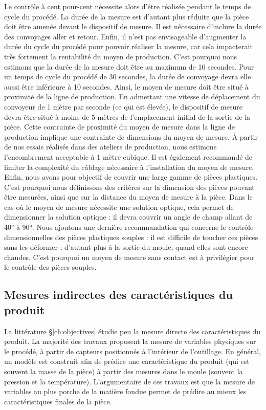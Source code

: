 Le contrôle à cent pour-cent nécessite alors d'être réalisée pendant le temps de cycle du procédé.
La durée de la mesure est d'autant plus réduite que la pièce doit être amenée devant le dispositif de mesure.
Il est nécessaire d'inclure la durée des convoyages aller et retour.
Enfin, il n'est pas envisageable d'augmenter la durée du cycle du procédé pour pouvoir réaliser la mesure, car cela impacterait très fortement la rentabilité du moyen de production.
C'est pourquoi nous estimons que la durée de la mesure doit être au maximum de 10 secondes.
Pour un temps de cycle du procédé de 30 secondes, la durée de convoyage devra elle aussi être inférieure à 10 secondes.
%
Ainsi, le moyen de mesure doit être situé à proximité de la ligne de production.
En admettant une vitesse de déplacement du convoyeur de 1 mètre par seconde (ce qui est élevée), le dispositif de mesure devra être situé à moins de 5 mètres de l'emplacement initial de la sortie de la pièce.
%
Cette contrainte de proximité du moyen de mesure dans la ligne de production implique une contrainte de dimensions du moyen de mesure.
À partir de nos essais réalisés dans des ateliers de production, nous estimons l'encombrement acceptable à 1 mètre cubique.
Il est également recommandé de limiter la complexité du câblage nécessaire à l'installation du moyen de mesure.
%
Enfin, nous avons pour objectif de couvrir une large gamme de pièces plastiques.
C'est pourquoi nous définissons des critères sur la dimension des pièces pouvant être mesurées, ainsi que sur la distance du moyen de mesure à la pièce.
Dans le cas où le moyen de mesure nécessite une solution optique, cela permet de dimensionner la solution optique : il devra couvrir un angle de champ allant de 40° à 90°.
%
Nous ajoutons une dernière recommandation qui concerne le contrôle dimensionnelles des pièces plastiques souples : il est difficile de toucher ces pièces sans les déformer ; d'autant plus à la sortie du moule, quand elles sont encore chaudes.
C'est pourquoi un moyen de mesure sans contact est à privilégier pour le contrôle des pièces souples.

\subsection{Mesures indirectes des caractéristiques du produit} \label{subsec:indirect_measures}
La littérature §\ref{ch:objectives} étudie peu la mesure directe des caractéristiques du produit.
La majorité des travaux proposent la mesure de variables physiques sur le procédé, à partir de capteurs positionnés à l'intérieur de l'outillage.
En général, un modèle est construit afin de prédire une caractéristique du produit (qui est souvent la masse de la pièce) à partir des mesures dans le moule (souvent la pression et la température).
L'argumentaire de ces travaux est que la mesure de variables au plus porche de la matière fondue permet de prédire au mieux les caractéristiques finales de la pièce.

